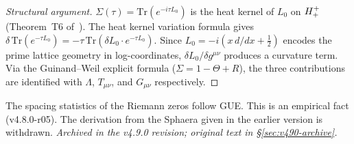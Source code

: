 \begin{proof}[Structural argument]
$\Sigma(\tau)=\mathrm{Tr}(e^{-i\tau L_0})$ is the heat kernel of $L_0$
on $H^+_+$ (Theorem~T6 of~\cite{brendecke2026rh}).
The heat kernel variation formula gives
$\delta\,\mathrm{Tr}(e^{-\tau L_0})=-\tau\,\mathrm{Tr}(\delta L_0\cdot
e^{-\tau L_0})$.
Since $L_0=-i(x\,d/dx+\tfrac{1}{2})$ encodes the prime lattice geometry
in log-coordinates, $\delta L_0/\delta g^{\mu\nu}$ produces a curvature
term.
Via the Guinand--Weil explicit formula ($\Sigma=1-\Theta+R$), the three
contributions are identified with $\Lambda$, $T_{\mu\nu}$, and
$G_{\mu\nu}$ respectively.
\end{proof}


\begin{theorem}\label{thm:gue}
The spacing statistics of the Riemann zeros follow GUE.  This is an empirical fact (v4.8.0-r05).  The derivation from the Sphaera given in the earlier version is withdrawn.
\emph{Archived in the v4.9.0 revision; original text in \S\ref{sec:v490-archive}.}
\end{theorem}

